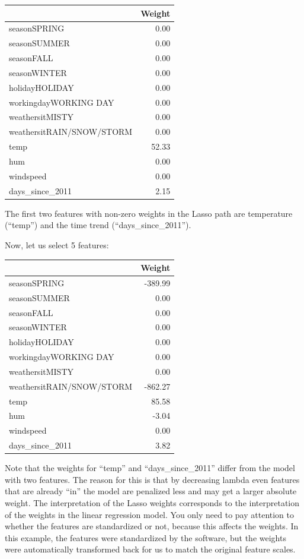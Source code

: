 \documentclass[
  12pt,
]{krantz}
\begin{document}
\begin{tabular}{l|r}
\hline
  & Weight\\
\hline
seasonSPRING & 0.00\\
\hline
seasonSUMMER & 0.00\\
\hline
seasonFALL & 0.00\\
\hline
seasonWINTER & 0.00\\
\hline
holidayHOLIDAY & 0.00\\
\hline
workingdayWORKING DAY & 0.00\\
\hline
weathersitMISTY & 0.00\\
\hline
weathersitRAIN/SNOW/STORM & 0.00\\
\hline
temp & 52.33\\
\hline
hum & 0.00\\
\hline
windspeed & 0.00\\
\hline
days\_since\_2011 & 2.15\\
\hline
\end{tabular}

The first two features with non-zero weights in the Lasso path are temperature (``temp'') and the time trend (``days\_since\_2011'').

Now, let us select 5 features:

\begin{tabular}{l|r}
\hline
  & Weight\\
\hline
seasonSPRING & -389.99\\
\hline
seasonSUMMER & 0.00\\
\hline
seasonFALL & 0.00\\
\hline
seasonWINTER & 0.00\\
\hline
holidayHOLIDAY & 0.00\\
\hline
workingdayWORKING DAY & 0.00\\
\hline
weathersitMISTY & 0.00\\
\hline
weathersitRAIN/SNOW/STORM & -862.27\\
\hline
temp & 85.58\\
\hline
hum & -3.04\\
\hline
windspeed & 0.00\\
\hline
days\_since\_2011 & 3.82\\
\hline
\end{tabular}

Note that the weights for ``temp'' and ``days\_since\_2011'' differ from the model with two features.
The reason for this is that by decreasing lambda even features that are already ``in'' the model are penalized less and may get a larger absolute weight.
The interpretation of the Lasso weights corresponds to the interpretation of the weights in the linear regression model.
You only need to pay attention to whether the features are standardized or not, because this affects the weights.
In this example, the features were standardized by the software, but the weights were automatically transformed back for us to match the original feature scales.
\end{document}
